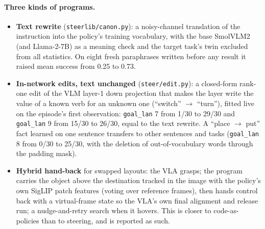 \documentclass[11pt]{article}
\begin{document}
\paragraph{Three kinds of programs.}
\begin{itemize}
\item \textbf{Text rewrite} (\texttt{steerlib/canon.py}): a noisy-channel translation of the instruction into the policy's training
vocabulary, with the base SmolVLM2 (and Llama-2-7B) as a meaning check and the target task's twin excluded from all statistics. On
eight fresh paraphrases written before any result it raised mean success from 0.25 to 0.73.
\item \textbf{In-network edits, text unchanged} (\texttt{steer/edit.py}): a closed-form rank-one edit of the VLM layer-1 down
projection that makes the layer write the value of a known verb for an unknown one (``switch'' $\to$ ``turn''), fitted live on the
episode's first observation: \texttt{goal\_lan} 7 from 1/30 to 29/30 and \texttt{goal\_lan} 9 from 15/30 to 26/30, equal to the text
rewrite. A ``place $\to$ put'' fact learned on one sentence transfers to other sentences and tasks (\texttt{goal\_lan} 8 from 0/30 to
25/30, with the deletion of out-of-vocabulary words through the padding mask).
\item \textbf{Hybrid hand-back} for swapped layouts: the VLA grasps; the program carries the object above the destination tracked
in the image with the policy's own SigLIP patch features (voting over reference frames), then hands control back with a
virtual-frame state so the VLA's own final alignment and release run; a nudge-and-retry search when it hovers. This is closer to
code-as-policies than to steering, and is reported as such.
\end{itemize}
\end{document}

